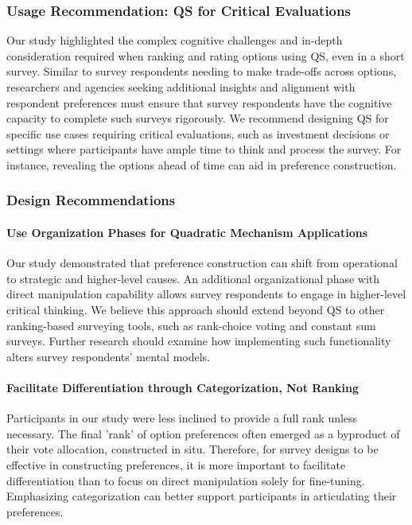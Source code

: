 \subsubsection{Usage Recommendation: QS for Critical Evaluations}
Our study highlighted the complex cognitive challenges and in-depth consideration required when ranking and rating options using QS, even in a short survey. Similar to survey respondents needing to make trade-offs across options, researchers and agencies seeking additional insights and alignment with respondent preferences must ensure that survey respondents have the cognitive capacity to complete such surveys rigorously. We recommend designing QS for specific use cases requiring critical evaluations, such as investment decisions or settings where participants have ample time to think and process the survey. For instance, revealing the options ahead of time can aid in preference construction.

\subsubsection{Design Recommendations}
\paragraph{Use Organization Phases for Quadratic Mechanism Applications}
Our study demonstrated that preference construction can shift from operational to strategic and higher-level causes. An additional organizational phase with direct manipulation capability allows survey respondents to engage in higher-level critical thinking. We believe this approach should extend beyond QS to other ranking-based surveying tools, such as rank-choice voting and constant sum surveys. Further research should examine how implementing such functionality alters survey respondents' mental models.

\paragraph{Facilitate Differentiation through Categorization, Not Ranking}
Participants in our study were less inclined to provide a full rank unless necessary. The final 'rank' of option preferences often emerged as a byproduct of their vote allocation, constructed in situ. Therefore, for survey designs to be effective in constructing preferences, it is more important to facilitate differentiation than to focus on direct manipulation solely for fine-tuning. Emphasizing categorization can better support participants in articulating their preferences.

